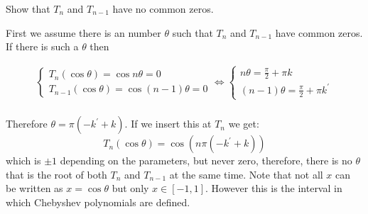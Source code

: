 \begin{problem}
  Show that $T_n$ and $T_{n-1}$ have no common zeros.
\end{problem}

\begin{solution}
  First we assume there is an number $\theta$ such that $T_n$ and $T_{n-1}$ have common zeros.
  If there is such a $\theta$ then
  
  \begin{align*}
    \label{eq:CommonZero}
    \begin{cases}
      T_n(\cos\theta) = \cos n\theta = 0 \\
      T_{n-1}(\cos\theta) = \cos (n-1)\theta = 0
    \end{cases}
    \Leftrightarrow
    \begin{cases}
      n\theta = \frac{\pi}{2} + \pi k \\
      (n-1)\theta = \frac{\pi}{2} + \pi k^{\prime}
    \end{cases} \\
  \end{align*}

  Therefore $\theta = \pi(-k^{\prime} + k)$. If we insert this at $T_n$ we get:
  \begin{equation*}
  T_n(\cos \theta) = \cos(n\pi(-k^{\prime} + k))
  \end{equation*} which is $\pm 1$ depending on the parameters, but never zero,
  therefore, there is no $\theta$ that is the root of both $T_n$ and $T_{n-1}$
  at the same time. Note that not all $x$ can be written as
  $x = \cos \theta$ but only $x \in [-1, 1]$. However this is the
  interval in which Chebyshev polynomials are defined.
  \end{solution}

